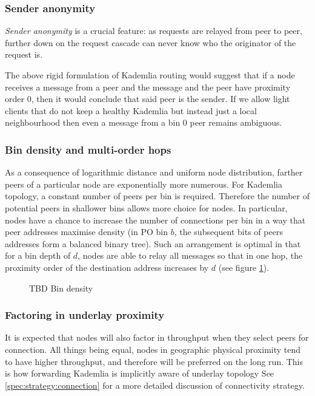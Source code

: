 \subsubsection{Sender anonymity}
 \emph{Sender anonymity} is a crucial feature: as requests are relayed from peer to peer, further down on the request cascade can never know who the originator of the request is. 

The above rigid formulation of Kademlia routing would suggest that if a node receives a message from a peer and the message and the peer have proximity order 0, then it would conclude that said peer is the sender. If we allow light clients that do not keep a healthy Kademlia but instead just a local neighbourhood then even a message from a bin 0 peer remains ambiguous. 

\subsubsection{Bin density and multi-order hops}

As a consequence of logarithmic distance and uniform node distribution, farther peers of a particular node are exponentially more numerous. For Kademlia topology, a constant number of peers per bin is required. Therefore the number of potential peers in shallower bins allows more choice for nodes. In particular, nodes have a chance to increase the number of connections per bin in a way that peer addresses maximise density (in PO bin $b$, the subsequent bits of peers addresses form a balanced binary tree). Such an arrangement is optimal in that for a bin depth of $d$, nodes are able to relay all messages so that in one hop, the proximity order of the destination address increases by $d$ (see figure \ref{fig:bindensity}). 


\begin{figure}[htbp]
   \centering
   \caption[Bin density]{TBD Bin density}
   \label{fig:bindensity}
\end{figure}

\subsubsection{Factoring in underlay proximity}
It is expected that nodes will also factor in throughput when they select peers for connection. All things being equal, nodes in geographic physical proximity tend to have higher throughput, and therefore will be preferred on the long run. This is how forwarding Kademlia is implicitly aware of underlay topology \cite{heep2010r}See \ref{spec:strategy:connection} for a more detailed discussion of connectivity strategy.


